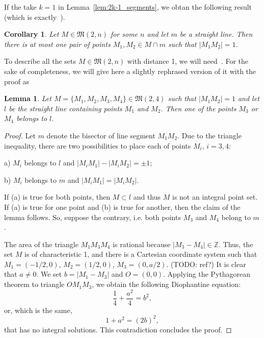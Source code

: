 \documentclass[a4paper,14pt]{article} %
\theoremstyle{plain}
\newtheorem{lemma}[theorem]{Lemma}
\newtheorem{corollary}[theorem]{Corollary}
\theoremstyle{definition}
\begin{document}
If the take $k=1$ in Lemma~\ref{lem:2k-1_segments},
we obtan the following result (which is exactly~\cite[Lemma 3]{our-vmmsh-2018}).
\begin{corollary}
	\label{cor:only_one_distance_1_on_straight_line}
	Let $M \in \mathfrak{M}(2,n)$ for some $n$ and let $m$ be a straight line.
	Then there is at most one pair of points $M_1,M_2\in M \cap m$
	such that $|M_1 M_2| = 1$.
\end{corollary}

To describe all the sets $M \in \mathfrak{M}(2,n)$ with distance 1,
we will need~\cite[Proposition 6]{our-vmmsh-2018}.
For the sake of completeness, we will give here a slightly rephrased version of it with the proof as
\begin{lemma}
	\label{lem:no_4_points_in_semigeneral_position_with_distance_1}
	Let $M=\{M_1,M_2,M_3,M_4\}\in \mathfrak{M}(2,4)$ such that $|M_1 M_2|=1$
	and let $l$ be the straight line containing points $M_1$ and $M_2$.
	Then one of the points $M_3$ or $M_4$ belongs to $l$.
\end{lemma}

\begin{proof}
	Let $m$ denote the bisector of line segment $M_1 M_2$.
	Due to the triangle inequality, there are two possibilities to place each of points $M_i$, $i=3,4$:

	a) $M_i$ belongs to $l$ and $|M_i M_1|-|M_i M_2| = \pm 1$;

	b) $M_i$ belongs to $m$ and $|M_i M_1| = |M_i M_2|$.

	If (a) is true for both points, then $M\subset l$ and thus $M$ is not an integral point set.
	If (a) is true for one point and (b) is true for another, then the claim of the lemma follows.
	So, suppose the contrary, i.e. both points $M_3$ and $M_4$ belong to $m$.

	The area of the triangle $M_1 M_3 M_4$ is rational because $|M_3 - M_4| \in \mathbb{Z}$.
	Thus, the set $M$ is of characteristic 1,
	and there is a Cartesian coordinate system such that $M_1=(-1/2,0)$, $M_2=(1/2,0)$, $M_3=(0, a/2)$.
	(TODO: ref?)
	It is clear that $a\neq 0$.
	We set $b = |M_1 - M_3|$ and $O=(0,0)$.
	Applying the Pythagorean theorem to triangle $OM_1M_3$, we obtain the following Diophantine equation:
	\begin{equation}
		\frac{1}{4} + \frac{a^2}{4} = b^2
		,
	\end{equation}
	or, which is the same,
	\begin{equation}
		1 + a^2 = (2b)^2
		,
	\end{equation}
	that has no integral solutions.
	This contradiction concludes the proof.
\end{proof}
\end{document}
